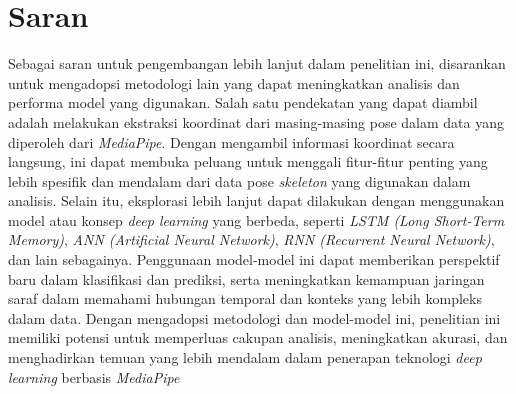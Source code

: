 \section{Saran}
Sebagai saran untuk pengembangan lebih lanjut dalam penelitian ini, disarankan untuk mengadopsi metodologi lain yang dapat meningkatkan analisis dan performa model yang digunakan. Salah satu pendekatan yang dapat diambil adalah melakukan ekstraksi koordinat dari masing-masing pose dalam data yang diperoleh dari \textit{MediaPipe}. Dengan mengambil informasi koordinat secara langsung, ini dapat membuka peluang untuk menggali fitur-fitur penting yang lebih spesifik dan mendalam dari data pose \textit{skeleton} yang digunakan dalam analisis. Selain itu, eksplorasi lebih lanjut dapat dilakukan dengan menggunakan model atau konsep \textit{deep learning} yang berbeda, seperti \textit{LSTM (Long Short-Term Memory)}, \textit{ANN (Artificial Neural Network)},\textit{ RNN (Recurrent Neural Network)}, dan lain sebagainya. Penggunaan model-model ini dapat memberikan perspektif baru dalam klasifikasi dan prediksi, serta meningkatkan kemampuan jaringan saraf dalam memahami hubungan temporal dan konteks yang lebih kompleks dalam data. Dengan mengadopsi metodologi dan model-model ini, penelitian ini memiliki potensi untuk memperluas cakupan analisis, meningkatkan akurasi, dan menghadirkan temuan yang lebih mendalam dalam penerapan teknologi \textit{deep learning} berbasis \textit{MediaPipe}


